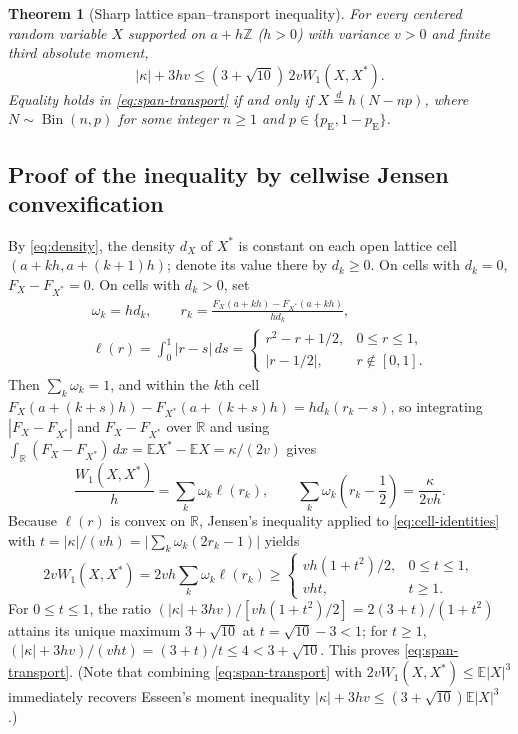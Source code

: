 \documentclass[11pt]{article}
\numberwithin{equation}{section}
\newtheorem{theorem}{Theorem}[section]
\theoremstyle{remark}
\DeclareMathOperator{\Bin}{Bin}
\newcommand{\E}{\mathbb E}
\newcommand{\R}{\mathbb R}
\newcommand{\Z}{\mathbb Z}
\begin{document}
\begin{theorem}[Sharp lattice span--transport inequality]\label{thm:span}
For every centered random variable $X$ supported on $a+h\Z$ ($h>0$) with
variance $v>0$ and finite third absolute moment,
\begin{equation}\label{eq:span-transport}
              |\kappa|+3hv\le(3+\sqrt{10})\,2v W_1(X,X^*).
\end{equation}
Equality holds in \eqref{eq:span-transport} if and only if $X\stackrel d=h(N-np)$,
where $N\sim\Bin(n,p)$ for some integer $n\ge1$ and
$p\in\{p_{\mathrm E},1-p_{\mathrm E}\}$.
\end{theorem}

\subsection{Proof of the inequality by cellwise Jensen convexification}

By \eqref{eq:density}, the density $d_X$ of $X^*$ is constant on each open
lattice cell $(a+kh,a+(k+1)h)$; denote its value there by $d_k\ge0$. On cells
with $d_k=0$, $F_X-F_{X^*}=0$. On cells with $d_k>0$, set
\begin{gather*}
 \omega_k=hd_k,\qquad
 r_k=\frac{F_X(a+kh)-F_{X^*}(a+kh)}{hd_k},\\
 \ell(r)=\int_0^1|r-s|\,ds=
 \begin{cases}
 r^2-r+1/2,&0\le r\le1,\\
 |r-1/2|,&r\notin[0,1].
 \end{cases}
\end{gather*}
Then $\sum_k\omega_k=1$, and within the $k$th cell $F_X(a+(k+s)h)-F_{X^*}(a+(k+s)h)=hd_k(r_k-s)$,
so integrating $|F_X-F_{X^*}|$ and $F_X-F_{X^*}$ over $\R$ and using
$\int_\R(F_X-F_{X^*})\,dx=\E X^*-\E X=\kappa/(2v)$ gives
\begin{equation}\label{eq:cell-identities}
 \frac{W_1(X,X^*)}h=\sum_k\omega_k\ell(r_k),\qquad
 \sum_k\omega_k\left(r_k-\frac12\right)=\frac\kappa{2vh}.
\end{equation}
Because $\ell(r)$ is convex on $\R$, Jensen's inequality applied to
\eqref{eq:cell-identities} with $t=|\kappa|/(vh)=\bigl|\sum_k\omega_k(2r_k-1)\bigr|$
yields
\begin{equation}\label{eq:jensen-bound}
 2vW_1(X,X^*)=2vh\sum_k\omega_k\ell(r_k)\ge
 \begin{cases}
 vh(1+t^2)/2,&0\le t\le1,\\
 vht,&t\ge1.
 \end{cases}
\end{equation}
For $0\le t\le1$, the ratio $(|\kappa|+3hv)/[vh(1+t^2)/2]=2(3+t)/(1+t^2)$
attains its unique maximum $3+\sqrt{10}$ at $t=\sqrt{10}-3<1$; for $t\ge1$,
$(|\kappa|+3hv)/(vht)=(3+t)/t\le4<3+\sqrt{10}$. This proves
\eqref{eq:span-transport}. (Note that combining \eqref{eq:span-transport}
with $2vW_1(X,X^*)\le\E|X|^3$ immediately recovers Esseen's moment inequality
$|\kappa|+3hv\le(3+\sqrt{10})\E|X|^3$ \citep[Lemma~1]{Esseen1956}.)
\end{document}
